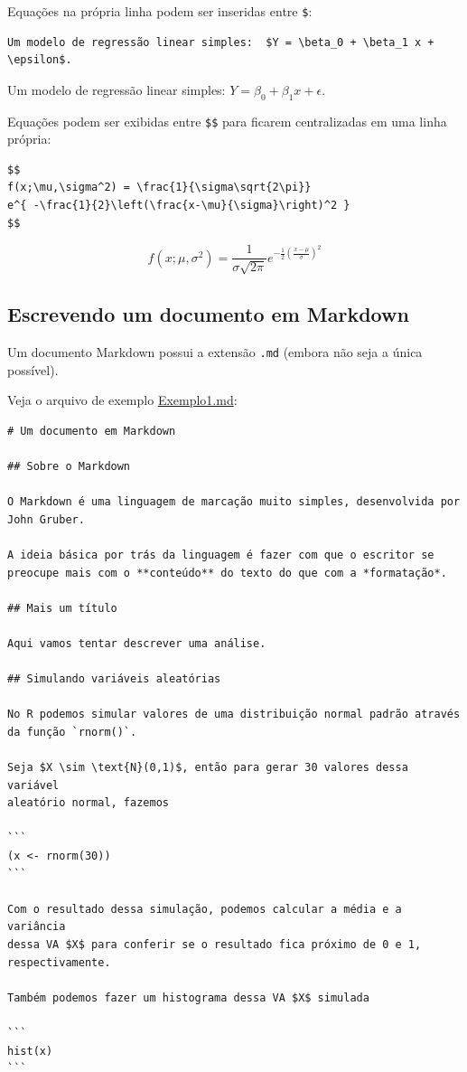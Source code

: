 \documentclass[
  10pt,
  a4paper]{book}
\begin{document}
Equações na própria linha podem ser inseridas entre \texttt{\$}:

\begin{verbatim}
Um modelo de regressão linear simples:  $Y = \beta_0 + \beta_1 x + \epsilon$.
\end{verbatim}

Um modelo de regressão linear simples: \(Y = \beta_0 + \beta_1 x + \epsilon\).

Equações podem ser exibidas entre \texttt{\$\$} para ficarem centralizadas em uma
linha própria:

\begin{verbatim}
$$
f(x;\mu,\sigma^2) = \frac{1}{\sigma\sqrt{2\pi}}
e^{ -\frac{1}{2}\left(\frac{x-\mu}{\sigma}\right)^2 }
$$
\end{verbatim}

\[
f(x;\mu,\sigma^2) = \frac{1}{\sigma\sqrt{2\pi}}
e^{ -\frac{1}{2}\left(\frac{x-\mu}{\sigma}\right)^2 }
\]

\hypertarget{escrevendo-um-documento-em-markdown}{%
\subsection{Escrevendo um documento em Markdown}\label{escrevendo-um-documento-em-markdown}}

Um documento Markdown possui a extensão \texttt{.md} (embora não seja a única
possível).

Veja o arquivo de exemplo \href{exemplos/Exemplo1.md}{Exemplo1.md}:

\begin{verbatim}
# Um documento em Markdown

## Sobre o Markdown

O Markdown é uma linguagem de marcação muito simples, desenvolvida por
John Gruber.

A ideia básica por trás da linguagem é fazer com que o escritor se
preocupe mais com o **conteúdo** do texto do que com a *formatação*.

## Mais um título

Aqui vamos tentar descrever uma análise.

## Simulando variáveis aleatórias

No R podemos simular valores de uma distribuição normal padrão através
da função `rnorm()`.

Seja $X \sim \text{N}(0,1)$, então para gerar 30 valores dessa variável
aleatório normal, fazemos

```
(x <- rnorm(30))
```

Com o resultado dessa simulação, podemos calcular a média e a variância
dessa VA $X$ para conferir se o resultado fica próximo de 0 e 1,
respectivamente.

Também podemos fazer um histograma dessa VA $X$ simulada

```
hist(x)
```
\end{verbatim}
\end{document}
